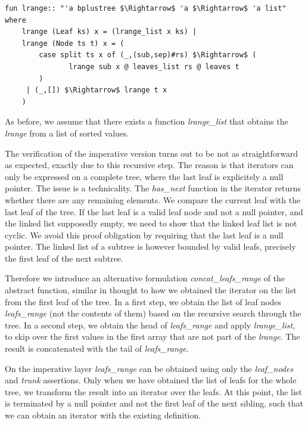 \documentclass[a4paper,UKenglish,cleveref, autoref, thm-restate]{lipics-v2021}
\begin{document}
\begin{lstlisting}[mathescape=true, language=Isabelle,label=lst:btree-lrange]
fun lrange:: "'a bplustree $\Rightarrow$ 'a $\Rightarrow$ 'a list" where
    lrange (Leaf ks) x = (lrange_list x ks) |
    lrange (Node ts t) x = (
        case split ts x of (_,(sub,sep)#rs) $\Rightarrow$ (
               lrange sub x @ leaves_list rs @ leaves t
        )
     | (_,[]) $\Rightarrow$ lrange t x
    )
\end{lstlisting}
  
As before, we assume that there exists a function \textit{lrange\_list} that
obtains the \emph{lrange} from a list of sorted values.

The verification of the imperative version turns out to be not as straightforward
as expected, exactly due to this recursive step.
The reason is that iterators can only be expressed on a complete tree,
where the last leaf is explicitely a null pointer.
The issue is a technicality. The \textit{has\_next} function
in the iterator returns whether there are any remaining elements.
We compare the current leaf with the last leaf of the tree.
If the last leaf is a valid leaf node and not a null pointer, and
the linked list supposedly empty, we need to show
that the linked leaf list is not cyclic.
We avoid this proof obligation by requiring that the last leaf is a null pointer.
The linked list of a subtree is however bounded by valid leafs,
precisely the first leaf of the next subtree.

Therefore we introduce an alternative formulation \emph{concat\_leafs\_range} of the
abstract function, similar in thought to how we obtained the iterator
on the list from the first leaf of the tree.
In a first step, we obtain the list of leaf nodes \emph{leafs\_range} (not the contents of them)
based on the recursive search through the tree.
In a second step, we obtain the head of \emph{leafs\_range} and apply \emph{lrange\_list},
to skip over the first values in the first array that are not part of the \emph{lrange}.
The result is concatenated with the tail of \emph{leafs\_range}.

On the imperative layer \emph{leafs\_range}
can be obtained using only the \emph{leaf\_nodes} and \emph{trunk}
assertions.
Only when we have obtained the list of leafs for the whole tree,
we transform the result into an iterator over the leafs.
At this point, the list is terminated by a null pointer
and not the first leaf of the next sibling,
such that we can obtain an iterator with the existing definition.
\end{document}
